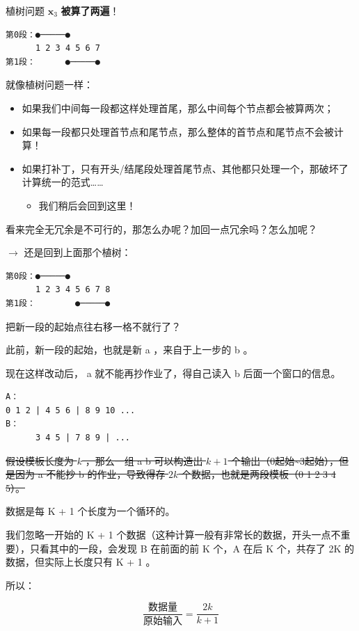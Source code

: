 \documentclass[aspectratio=169,10pt]{beamer}
\begin{document}
\begin{frame}[fragile]{植树问题}
$\mathbf{x}_3$ \textbf{被算了两遍}！
\par
\begin{Verbatim}[fontsize=\small]
第0段：●─────●
      1 2 3 4 5 6 7
第1段：      ●─────●
\end{Verbatim}
就像植树问题一样：
\par
\begin{itemize}
\item 如果我们中间每一段都这样处理首尾，那么中间每个节点都会被算两次；
\item 如果每一段都只处理首节点和尾节点，那么整体的首节点和尾节点不会被计算！
\item 如果打补丁，只有开头/结尾段处理首尾节点、其他都只处理一个，那破坏了计算统一的范式……
\begin{itemize}
\item 我们稍后会回到这里！
\end{itemize}
\end{itemize}
看来完全无冗余是不可行的，那怎么办呢？加回一点冗余吗？怎么加呢？
\par
\end{frame}

\begin{frame}[fragile,shrink=18]{\ensuremath{\rightarrow}}
还是回到上面那个植树：
\par
\begin{Verbatim}[fontsize=\small]
第0段：●─────●
      1 2 3 4 5 6 7 8
第1段：        ●─────●
\end{Verbatim}
把新一段的起始点往右移一格不就行了？
\par
此前，新一段的起始，也就是新 a ，来自于上一步的 b 。
\par
现在这样改动后， a 就不能再抄作业了，得自己读入 b 后面一个窗口的信息。
\par
\begin{Verbatim}[fontsize=\small]
A：
0 1 2 | 4 5 6 | 8 9 10 ...
B：
      3 4 5 | 7 8 9 | ...
\end{Verbatim}
\sout{假设模板长度为 $k$ ，那么一组 a b 可以构造出 $k+1$ 个输出（0起始\textasciitilde{}3起始），但是因为 a 不能抄 b 的作业，导致得存 $2k$ 个数据，也就是两段模板（0 1 2 3 4 5）。}
\par
数据是每 K + 1 个长度为一个循环的。
\par
我们忽略一开始的 K + 1 个数据（这种计算一般有非常长的数据，开头一点不重要），只看其中的一段，会发现 B 在前面的前 K 个，A 在后 K 个，共存了 2K 的数据，但实际上长度只有 K + 1 。
\par
所以：
\par
\[
\dfrac{数据量}{原始输入}=\dfrac{2k}{k+1}
\]
\end{frame}
\end{document}
